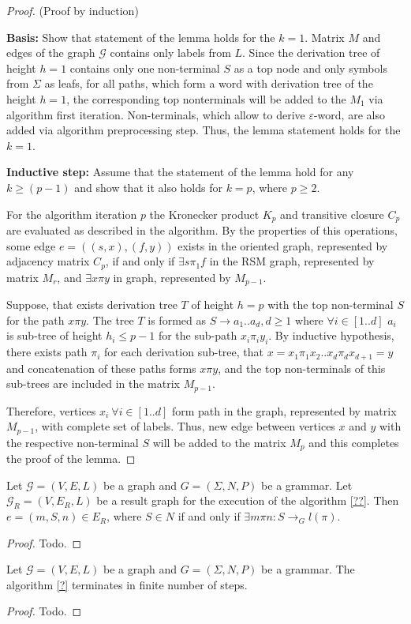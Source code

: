 \begin{proof}{(Proof by induction)}

    \textbf{Basis:} Show that statement of the lemma holds for the $k = 1$. Matrix
    $M$ and edges of the graph $\mathcal{G}$ contains only labels from $L$. 
    Since the derivation tree of height $h = 1$ contains only one non-terminal $S$ as 
    a top node and only symbols from $\Sigma$ as leafs, for all paths, which form a 
    word with derivation tree of the height $h = 1$, the corresponding top nonterminals will
    be added to the $M_1$ via algorithm first iteration. Non-terminals, which allow 
    to derive $\varepsilon$-word, are also added via algorithm preprocessing step. 
    Thus, the lemma statement holds for the $k = 1$.

    \textbf{Inductive step:} Assume that the statement of the lemma hold for any
    $k \geq (p - 1)$ and show that it also holds for $k = p$, where $p \geq 2$.
    
    For the algorithm iteration $p$ the Kronecker product $K_p$ and transitive
    closure $C_p$ are evaluated as described in the algorithm. By the properties
    of this operations, some edge $e = ((s,x),(f,y))$ exists in the oriented
    graph, represented by adjacency matrix $C_p$, if and only if $\exists s
    \pi_1 f$ in the RSM graph, represented by matrix $M_r$, and $\exists x \pi y$
    in graph, represented by $M_{p-1}$. 
    
    Suppose, that exists derivation tree $T$ of height $h = p$ with the top non-terminal
    $S$ for the path $x \pi y$. The tree $T$ is formed as
    $S \to a_1 .. a_d, d \geq 1$ where $\forall i \in [1..d]$ $a_i$ is sub-tree of
    height $h_i \leq p - 1$ for the sub-path $x_i \pi_i y_i$. By inductive hypothesis,
    there exists path $\pi_i$ for each derivation sub-tree, that  
    $x = x_1 \pi_1 x_2 .. x_{d} \pi_{d} x_{d+1} = y$ and concatenation of these paths
    forms $x \pi y$, and the top non-terminals of this sub-trees are included in the
    matrix $M_{p - 1}$. 
    
    Therefore, vertices $ x_i ~\forall i \in [1..d]$ form path in the graph, 
    represented by matrix $M_{p-1}$, with complete set of labels.
    Thus, new edge between vertices $x$ and $y$ with the respective 
    non-terminal $S$ will be added to the matrix $M_p$ and this completes 
    the proof of the lemma.

\end{proof}

\begin{theorem}
    Let $\mathcal{G} = (V,E,L)$ be a graph and  $G = (\Sigma, N, P)$ be a grammar.
    Let $\mathcal{G}_R = (V, E_R, L)$  be a result graph for the execution 
    of the algorithm \ref{??}. Then $e = (m, S, n) \in E_R$, where $S \in N$ 
    if and only if $\exists m \pi n: S \to_G l(\pi)$. 
\end{theorem}{}

\begin{proof}
    Todo.
\end{proof}{}

\begin{theorem}{}
    Let $\mathcal{G} = (V,E,L)$ be a graph and $G = (\Sigma, N, P)$ be a grammar.
    The algorithm \ref{?} terminates in finite number of steps.
\end{theorem}

\begin{proof}
    Todo.
\end{proof}{}